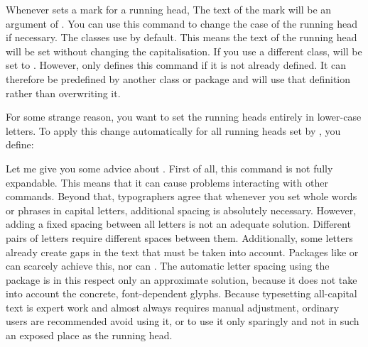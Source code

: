 \begin{Declaration}
\end{Declaration}
Whenever  sets a mark for a running head, The text of the
mark will be an argument of . You can use this command to
change the case of the running head if necessary. The \KOMAScript{} classes
use 
by default. This means the text of the running head will be set without
changing the capitalisation. If you use a different class,
 will be set to
%
. However,  only defines
this command if it is not already defined. It can therefore be predefined by
another class or package and  will use that definition
rather than overwriting it.
\begin{Example}
  For some strange reason, you want to set the running heads entirely in
  lower-case letters. To apply this change automatically for all running heads
  set by , you define:
\begin{lstcode}
  \let\MakeMarkcase\MakeLowercase
\end{lstcode}
\end{Example}
Let me give you some advice about
. First of all, this command is
not fully expandable. This means that it can cause problems interacting with
other commands. Beyond that, typographers agree that whenever you set whole
words or phrases in capital letters, additional spacing is absolutely
necessary. However, adding a fixed spacing between all letters is not an
adequate solution. Different pairs of letters require different spaces between
them. Additionally, some letters already create gaps in the text that must be
taken into account. Packages like  or  can
scarcely achieve this, nor can . The automatic letter
spacing using the  package is in this respect only an
approximate solution, because it does not take into account the concrete,
font-dependent glyphs. Because typesetting all-capital
text is expert work and almost always requires manual adjustment, ordinary
users are recommended avoid using it, or to use it only sparingly and not in
such an exposed place as the running head.%
\EndIndexGroup


